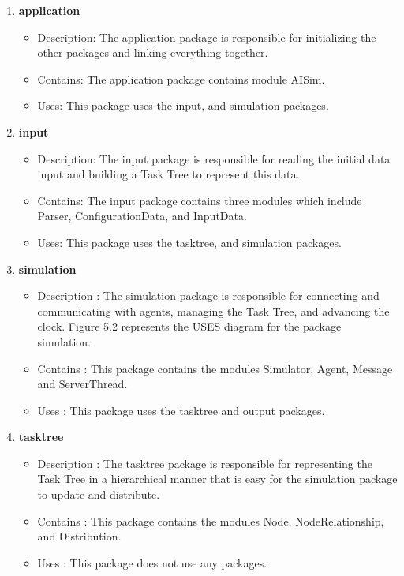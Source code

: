 \begin{enumerate}

\item\textbf{application}
\begin{itemize}
\item Description: The application package is responsible for initializing the other packages and linking everything together.
\item Contains: The application package contains module AISim.
\item Uses: This package uses the input, and simulation packages.
\end{itemize}

\item\textbf{input}
\begin{itemize}
\item Description: The input package is responsible for reading the initial data input and building a Task Tree to represent this data.
\item Contains: The input package contains three modules which include Parser, ConfigurationData, and InputData.
\item Uses: This package uses the tasktree, and simulation packages.
\end{itemize}

\item\textbf{simulation}
\begin{itemize}
\item Description : The simulation package is responsible for connecting and communicating with agents, managing the Task Tree, and advancing the clock. Figure 5.2 represents the USES diagram for the package simulation.
\item Contains : This package contains the modules Simulator, Agent, Message and ServerThread.
\item Uses : This package uses the tasktree and output packages.
\end{itemize}

\item\textbf{tasktree}
\begin{itemize}
\item Description : The tasktree package is responsible for representing the Task Tree in a hierarchical manner that is easy for the simulation package to update and distribute.
\item Contains : This package contains the modules Node, NodeRelationship, and Distribution.
\item Uses : This package does not use any packages.
\end{itemize}


\end{enumerate}
